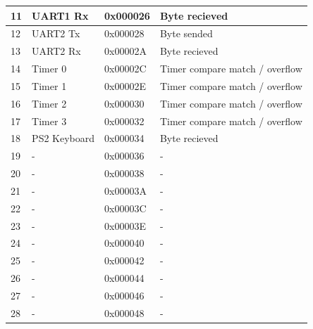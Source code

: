 \begin{table}[]
\begin{tabular}{|l|l|l|l|}
        11                  & UART1 Rx            & 0x000026        & Byte recieved                  \\ \hline
        12                  & UART2 Tx            & 0x000028        & Byte sended                    \\ \hline
        13                  & UART2 Rx            & 0x00002A        & Byte recieved                  \\ \hline
        14                  & Timer 0             & 0x00002C        & Timer compare match / overflow \\ \hline
        15                  & Timer 1             & 0x00002E        & Timer compare match / overflow \\ \hline
        16                  & Timer 2             & 0x000030        & Timer compare match / overflow \\ \hline
        17                  & Timer 3             & 0x000032        & Timer compare match / overflow \\ \hline
        18                  & PS2 Keyboard        & 0x000034        & Byte recieved                  \\ \hline
        19                  & -                   & 0x000036        & -                              \\ \hline
        20                  & -                   & 0x000038        & -                              \\ \hline
        21                  & -                   & 0x00003A        & -                              \\ \hline
        22                  & -                   & 0x00003C        & -                              \\ \hline
        23                  & -                   & 0x00003E        & -                              \\ \hline
        24                  & -                   & 0x000040        & -                              \\ \hline
        25                  & -                   & 0x000042        & -                              \\ \hline
        26                  & -                   & 0x000044        & -                              \\ \hline
        27                  & -                   & 0x000046        & -                              \\ \hline
        28                  & -                   & 0x000048        & -                              \\ \hline

\end{tabular}
\end{table}
